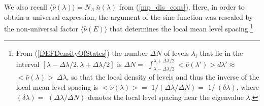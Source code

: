 \documentclass[aps,prb,preprint,onecolumn,amsmath,amssymb,superscriptaddress,eqsecnum,floatfix,scrartcl]{revtex4-1}
\begin{document}
We also  recall  $\langle{\hat \nu}(\lambda)\rangle=N_A \ \bar{n}(\lambda)$
from (\ref{mp_dis_cons}).
Here, in order to obtain a universal expression, the argument of the sine function was  rescaled by the non-universal factor
 $\langle{\hat \nu}(E)\rangle$ that determines the local mean level
 spacing.\footnote{From (\ref{DEFDensityOfStates}) the number $\Delta N$ of levels $\lambda_i$  that lie in the interval $[\lambda-\Delta\lambda/2,
\lambda+\Delta \lambda/2]$ is $\Delta N =$ 
$\int_{\lambda-\Delta \lambda/2}^{\lambda+\Delta\lambda/2}<{\hat \nu}(\lambda')>
d\lambda'\approx$ $<{\hat \nu}(\lambda)> \ \Delta \lambda$, so that the local density of levels and thus the inverse of the local  mean
level spacing is $<{\hat \nu}(\lambda)>=$ $1/(\Delta \lambda/\Delta N)=$  $1/ \ \overline{(\delta \lambda)}$,
where $\overline{(\delta \lambda)}=$  $(\Delta \lambda/\Delta N)$
denotes the local level spacing near the eigenvalue $\lambda$.}
\end{document}
